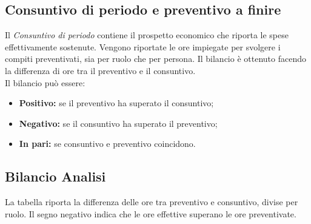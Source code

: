 \begin{flushleft}
    \chapter{Consuntivo di periodo e preventivo a finire}
    Il \textit{Consuntivo di periodo} contiene il prospetto economico che riporta le spese effettivamente sostenute. Vengono riportate le ore impiegate per svolgere i compiti preventivati, sia per
    ruolo che per persona. Il bilancio è ottenuto facendo la differenza di ore tra il preventivo e il consuntivo.\\
    Il bilancio può essere:
    \begin{itemize}
        \item \textbf{Positivo:} se il preventivo ha superato il consuntivo;
        \item \textbf{Negativo:} se il consuntivo ha superato il preventivo;
        \item \textbf{In pari:} se consuntivo e preventivo coincidono.
    \end{itemize}

   \newpage
    \section{Bilancio Analisi}
    La tabella riporta la differenza delle ore tra preventivo e consuntivo, divise per ruolo. Il segno negativo indica che le ore effettive superano le ore preventivate.  
      

\end{flushleft}
